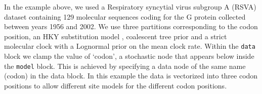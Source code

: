\documentclass[10pt,letterpaper,table]{article}
\begin{document}
In the example above, we used a Respiratory syncytial virus subgroup A (RSVA) dataset \cite{zlateva2004molecular, zlateva2005genetic} containing 129 molecular sequences coding for the G protein collected between years 1956 and 2002. 
We use three partitions corresponding to the codon position, an HKY substitution model \cite{hasegawa1985dating}, coalescent tree prior \cite{kingman82} and a strict molecular clock with a Lognormal prior on the mean clock rate. 
Within the \texttt{data} block we clamp the value of `codon', a stochastic node that appears below inside the \texttt{model} block. This is achieved by specifying a data node of the same name (codon) in the data block. 
In this example the data is vectorized into three codon positions to allow different site models for the different codon positions.




\end{document}
